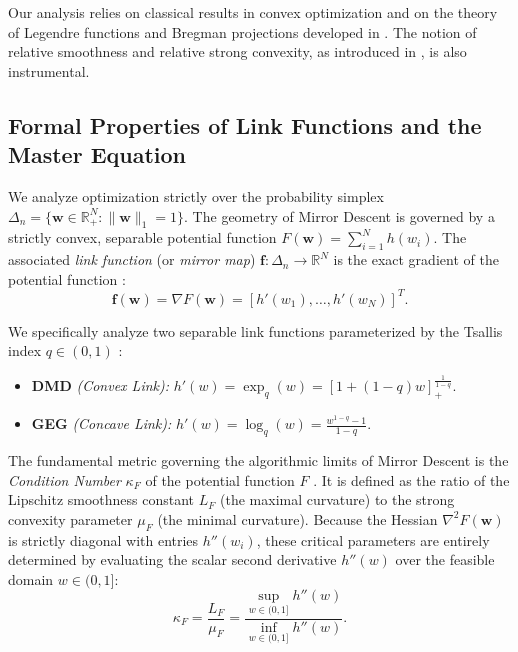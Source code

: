 \documentclass[10pt]{amsart}
\newcommand{\bof}{\boldsymbol{f}}
\newcommand{\bw}{\boldsymbol{w}}
\newcommand{\RR}{\mathbb{R}}
\theoremstyle{definition}
\theoremstyle{definition}	 %
\begin{document}
Our analysis relies on classical results in convex optimization \cite{Nemirowsky,Beck2003} and on the theory of Legendre functions and Bregman projections developed in \cite{BauschkeBorwein1997,BauschkeBorweinCombettes2001}. The notion of relative smoothness and relative strong convexity, as introduced in \cite{LuFreundNesterov2018}, is also instrumental.

\subsection{Formal Properties of Link Functions and the Master Equation}
\label{sec:formal_props}

We analyze optimization strictly over the probability simplex $\Delta_n= \{\bw \in \RR^N_+ : \|\bw\|_1 = 1\}$. The geometry of Mirror Descent is governed by a strictly convex, separable potential function $F(\bw) = \sum_{i=1}^N h(w_i)$. The associated \textit{link function} (or \emph{mirror map}) $\bof: \Delta_n \to \RR^N$ is the exact gradient of the potential function \cite{Nemirowsky,Beck2003,shalev2011}:
\begin{equation}
    \bof(\bw) = \nabla F(\bw) = [h'(w_1), \dots, h'(w_N)]^T.
\end{equation}

We specifically analyze two separable link functions parameterized by the Tsallis index $q \in (0,1)$ \cite{tsallis1988}:
\begin{itemize}
    \item \textbf{DMD} \textit{(Convex Link):} $h'(w) = \exp_q(w) = [1 + (1-q)w]_+^{\frac{1}{1-q}}$.
    \item \textbf{GEG} \textit{(Concave Link):} $h'(w) = \log_q(w) = \frac{w^{1-q}-1}{1-q}$.
\end{itemize}

The fundamental metric governing the algorithmic limits of Mirror Descent is the \textit{Condition Number} $\kappa_F$ of the potential function $F$ \cite{LuFreundNesterov2018}. It is defined as the ratio of the Lipschitz smoothness constant $L_F$ (the maximal curvature) to the strong convexity parameter $\mu_F$ (the minimal curvature). Because the Hessian $\nabla^2 F(\bw)$ is strictly diagonal with entries $h''(w_i)$, these critical parameters are entirely determined by evaluating the scalar second derivative $h''(w)$ over the feasible domain $w \in (0,1]$:
\begin{equation}
    \kappa_F = \frac{L_F}{\mu_F} = \frac{\sup_{w \in (0,1]} h''(w)}{\inf_{w \in (0,1]} h''(w)} .
    \label{eq:condition_number}
\end{equation}
    
\end{document}
